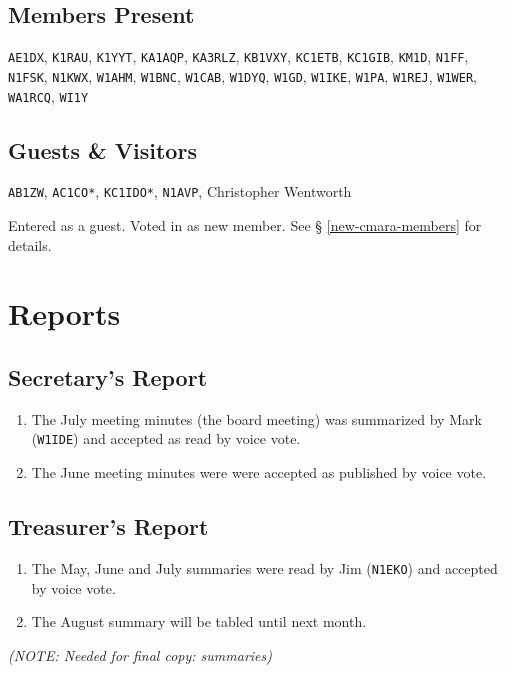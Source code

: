 \documentclass[10pt,letterpaper]{article}
\begin{document}
\subsection{Members Present}
\texttt{AE1DX},
\texttt{K1RAU},
\texttt{K1YYT},
\texttt{KA1AQP},
\texttt{KA3RLZ},
\texttt{KB1VXY},
\texttt{KC1ETB},
\texttt{KC1GIB},
\texttt{KM1D},
\texttt{N1FF},
\texttt{N1FSK},
\texttt{N1KWX},
\texttt{W1AHM},
\texttt{W1BNC},
\texttt{W1CAB},
\texttt{W1DYQ},
\texttt{W1GD},
\texttt{W1IKE},
\texttt{W1PA},
\texttt{W1REJ},
\texttt{W1WER},
\texttt{WA1RCQ},
\texttt{WI1Y}

\subsection{Guests \& Visitors}

\texttt{AB1ZW},
\texttt{AC1CO*},
\texttt{KC1IDO*},
\texttt{N1AVP},
Christopher Wentworth

\noindent
\textasteriskcentered{} Entered as a guest. Voted in as new member. See \S{} \ref{new-cmara-members} for details.

\section{Reports}

\subsection{Secretary's Report}
\begin{enumerate}
  \item The July meeting minutes (the board meeting) was summarized by Mark (\texttt{W1IDE}) and accepted as read by voice vote.
  \item The June meeting minutes were were accepted as published by voice vote.
\end{enumerate}

\newpage
\subsection{Treasurer's Report}
\begin{enumerate}
  \item The May, June and July summaries were read by Jim (\texttt{N1EKO}) and accepted by voice vote.
  \item The August summary will be tabled until next month.
\end{enumerate}

\noindent
\emph{(NOTE: Needed for final copy: summaries)}
\end{document}

